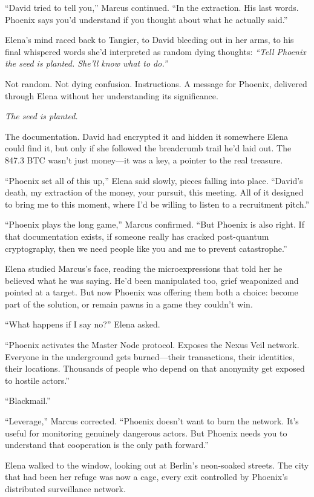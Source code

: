 \documentclass[12pt,letterpaper]{book}
\begin{document}
``David tried to tell you,'' Marcus continued. ``In the extraction. His last words. Phoenix says you'd understand if you thought about what he actually said.''

Elena's mind raced back to Tangier, to David bleeding out in her arms, to his final whispered words she'd interpreted as random dying thoughts: \emph{``Tell Phoenix the seed is planted. She'll know what to do.''}

Not random. Not dying confusion. Instructions. A message for Phoenix, delivered through Elena without her understanding its significance.

\emph{The seed is planted.}

The documentation. David had encrypted it and hidden it somewhere Elena could find it, but only if she followed the breadcrumb trail he'd laid out. The 847.3 BTC wasn't just money---it was a key, a pointer to the real treasure.

``Phoenix set all of this up,'' Elena said slowly, pieces falling into place. ``David's death, my extraction of the money, your pursuit, this meeting. All of it designed to bring me to this moment, where I'd be willing to listen to a recruitment pitch.''

``Phoenix plays the long game,'' Marcus confirmed. ``But Phoenix is also right. If that documentation exists, if someone really has cracked post-quantum cryptography, then we need people like you and me to prevent catastrophe.''

Elena studied Marcus's face, reading the microexpressions that told her he believed what he was saying. He'd been manipulated too, grief weaponized and pointed at a target. But now Phoenix was offering them both a choice: become part of the solution, or remain pawns in a game they couldn't win.

``What happens if I say no?'' Elena asked.

``Phoenix activates the Master Node protocol. Exposes the Nexus Veil network. Everyone in the underground gets burned---their transactions, their identities, their locations. Thousands of people who depend on that anonymity get exposed to hostile actors.''

``Blackmail.''

``Leverage,'' Marcus corrected. ``Phoenix doesn't want to burn the network. It's useful for monitoring genuinely dangerous actors. But Phoenix needs you to understand that cooperation is the only path forward.''

Elena walked to the window, looking out at Berlin's neon-soaked streets. The city that had been her refuge was now a cage, every exit controlled by Phoenix's distributed surveillance network.
\end{document}
